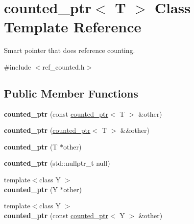 \hypertarget{classcounted__ptr}{}\section{counted\+\_\+ptr$<$ T $>$ Class Template Reference}
\label{classcounted__ptr}


Smart pointer that does reference counting.  




{\ttfamily \#include $<$ref\+\_\+counted.\+h$>$}

\subsection*{Public Member Functions}
\begin{DoxyCompactItemize}
\item 
\hypertarget{classcounted__ptr_ab7dea9d92b16a77c7611e86200b6bb0e}{}{\bfseries counted\+\_\+ptr} (const \hyperlink{classcounted__ptr}{counted\+\_\+ptr}$<$ T $>$ \&other)\label{classcounted__ptr_ab7dea9d92b16a77c7611e86200b6bb0e}

\item 
\hypertarget{classcounted__ptr_a43f26afa7273683978d154efa0449360}{}{\bfseries counted\+\_\+ptr} (\hyperlink{classcounted__ptr}{counted\+\_\+ptr}$<$ T $>$ \&\&other)\label{classcounted__ptr_a43f26afa7273683978d154efa0449360}

\item 
\hypertarget{classcounted__ptr_a2bb70ee91e76f9b07b237e22b88f329a}{}{\bfseries counted\+\_\+ptr} (T $\ast$other)\label{classcounted__ptr_a2bb70ee91e76f9b07b237e22b88f329a}

\item 
\hypertarget{classcounted__ptr_a60c0639256b2f8ed72e5c3a4cbe6ee69}{}{\bfseries counted\+\_\+ptr} (std\+::nullptr\+\_\+t null)\label{classcounted__ptr_a60c0639256b2f8ed72e5c3a4cbe6ee69}

\item 
\hypertarget{classcounted__ptr_a610bf3d74d1ade9fc47be78e83dfd6c3}{}{\footnotesize template$<$class Y $>$ }\\{\bfseries counted\+\_\+ptr} (Y $\ast$other)\label{classcounted__ptr_a610bf3d74d1ade9fc47be78e83dfd6c3}

\item 
\hypertarget{classcounted__ptr_a80d5131a8e2c5fa14a7205552b80dc30}{}{\footnotesize template$<$class Y $>$ }\\{\bfseries counted\+\_\+ptr} (const \hyperlink{classcounted__ptr}{counted\+\_\+ptr}$<$ Y $>$ \&other)\label{classcounted__ptr_a80d5131a8e2c5fa14a7205552b80dc30}


\end{DoxyCompactItemize}
